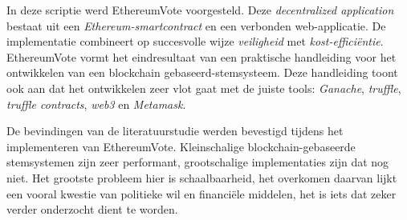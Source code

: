 In deze scriptie werd EthereumVote voorgesteld. Deze \textit{decentralized application} bestaat uit een \textit{Ethereum-smartcontract} en een verbonden web-applicatie. De implementatie combineert op succesvolle wijze \textit{veiligheid} met \textit{kost-efficiëntie}. EthereumVote vormt het eindresultaat van een praktische handleiding voor het ontwikkelen van een blockchain gebaseerd-stemsysteem. Deze handleiding toont ook aan dat het ontwikkelen zeer vlot gaat met de juiste tools: \textit{Ganache}, \textit{truffle}, \textit{truffle contracts}, \textit{web3} en \textit{Metamask}.

De bevindingen van de literatuurstudie werden bevestigd tijdens het implementeren van EthereumVote. Kleinschalige blockchain-gebaseerde stemsystemen zijn zeer performant,  grootschalige implementaties zijn dat nog niet. Het grootste probleem hier is schaalbaarheid, het overkomen daarvan lijkt een vooral kwestie van politieke wil en financiële middelen, het is iets dat zeker verder onderzocht dient te worden.
